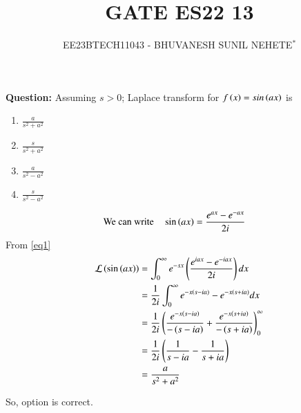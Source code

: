 \documentclass[journal,12pt,twocolumn]{IEEEtran}
\theoremstyle{remark}
\begin{document}

\vspace{3cm}

\title{GATE ES22 13}
\author{EE23BTECH11043 - BHUVANESH SUNIL NEHETE$^{*}$%
}
\maketitle
\newpage
\bigskip

\renewcommand{\thefigure}{\theenumi}
\renewcommand{\thetable}{\theenumi}



\textbf{Question:}
Assuming $s>0$; Laplace transform for $f\left(x\right) = sin\left(ax\right)$ is
\begin{enumerate}[label=(\Alph*)]
    \item $\frac{a}{s^2+a^2}$
    \item $\frac{s}{s^2+a^2}$
    \item $\frac{a}{s^2-a^2}$
    \item $\frac{s}{s^2-a^2}$
\end{enumerate}

\solution

\begin{align}
\text{We can write} \quad\sin\left(ax\right)&=\frac{e^{ax}-e^{-ax}}{2i}\label{eq1}
\end{align}
From \eqref{eq1}
\begin{align}
\mathcal{L}\left(\sin\left(ax\right)\right)&=\int_{0}^{\infty}e^{-sx}\left(\frac{e^{iax}-e^{-iax}}{2i}\right)dx\\
&=\frac{1}{2i}\int_{0}^{\infty}e^{-x\left(s-ia\right)}-e^{-x\left(s+ia\right)}dx\\
&=\frac{1}{2i}\left(\frac{e^{-x\left(s-ia\right)}}{-\left(s-ia\right)}+\frac{e^{-x\left(s+ia\right)}}{-\left(s+ia\right)}\right)_{0}^{\infty}\\
&=\frac{1}{2i}\left(\frac{1}{s-ia}-\frac{1}{s+ia}\right)\\
&=\frac{a}{s^2+a^2}
\end{align}

So, option  is correct.
 
\end{document}
